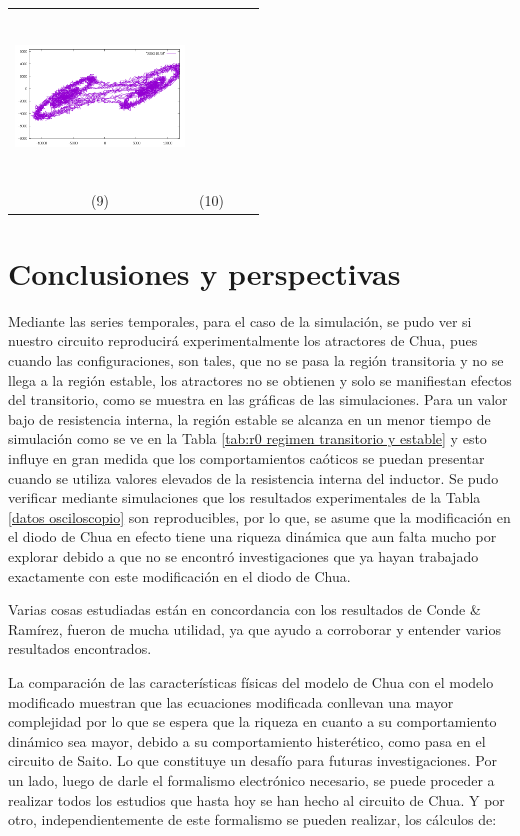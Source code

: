 \documentclass{rbf}
\begin{document}
\begin{table}[h]
\begin{tabular}{c c c c}
    \includegraphics[width=4.5cm,height=4.5cm]{imagenesDATOS/data10.png}\\
    (9) & (10)\\
    \end{tabular}
\end{table}

\section{Conclusiones y perspectivas}
Mediante las series temporales, para el caso de la simulación, se pudo ver si nuestro circuito reproducirá experimentalmente los atractores de Chua, pues cuando las configuraciones, son tales, que no se pasa la región transitoria y no se llega a la región estable, los atractores no se obtienen y solo se manifiestan efectos del transitorio, como se muestra en las  gráficas de las simulaciones. Para un valor bajo de resistencia interna, la región estable se alcanza en un menor tiempo de simulación  como se ve en la Tabla \ref{tab:r0 regimen transitorio y estable} y esto influye en gran medida que los comportamientos caóticos se puedan presentar cuando se utiliza valores elevados de la resistencia interna del inductor.
Se pudo verificar mediante simulaciones que los resultados experimentales de la Tabla \ref{datos osciloscopio} son reproducibles, por lo que, se asume que la modificación en el diodo de Chua en efecto tiene una riqueza dinámica que aun falta mucho por explorar debido a que no se encontró investigaciones que ya hayan trabajado exactamente con este modificación en el diodo de Chua.

Varias cosas estudiadas están en concordancia con los resultados de Conde & Ramírez, fueron de mucha utilidad, ya que ayudo a corroborar y entender varios resultados encontrados.

La comparación de las características físicas del modelo de Chua con el modelo modificado muestran que las ecuaciones modificada conllevan una mayor complejidad por lo que se espera que la riqueza en cuanto a su comportamiento dinámico sea mayor, debido a su comportamiento histerético, como pasa en el circuito de Saito. Lo que constituye un desafío para futuras investigaciones.
Por un lado, luego de darle el formalismo electrónico necesario, se puede proceder a realizar todos los estudios que hasta hoy se han hecho al circuito de Chua. Y por otro, independientemente de este formalismo se pueden realizar, los cálculos de:
\end{document}
